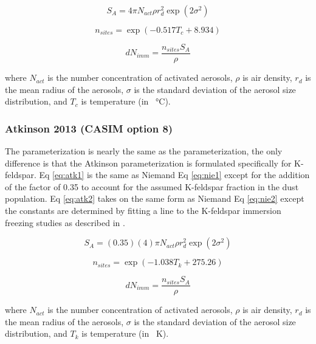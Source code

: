 \begin{equation} \label{eq:nie1}
S_A = 4\pi N_{act}\rho r_d^{2} \exp(2\sigma^{2})
\end{equation}

\begin{equation} \label{eq:nie2}
n_{sites} = \exp(-0.517T_c + 8.934)
\end{equation}

\begin{equation} \label{eq:nie3}
dN_{imm} = \frac{n_{sites} S_A}{\rho}
\end{equation}

where $N_{act}$ is the number concentration of activated aerosols, $\rho$ is air density, $r_d$ is the mean radius of the aerosols, $\sigma$ is the standard deviation of the aerosol size distribution, and $T_c$ is temperature (in \SI{}{\degreeCelsius}).


\subsubsection{Atkinson 2013 (CASIM option 8)}
The \cite{atk2013} parameterization is nearly the same as the \cite{niem2012} parameterization, the only difference is that the Atkinson parameterization is formulated specifically for K-feldspar. Eq \ref{eq:atk1} is the same as Niemand Eq \ref{eq:nie1} except for the addition of the factor of 0.35 to account for the assumed K-feldspar fraction in the dust population. Eq \ref{eq:atk2} takes on the same form as Niemand Eq \ref{eq:nie2} except the constants are determined by fitting a line to the K-feldspar immersion freezing studies as described in \cite{atk2013}.

\begin{equation} \label{eq:atk1}
S_A = (0.35)(4)\pi N_{act} \rho r_d^{2} \exp(2\sigma^{2})
\end{equation}

\begin{equation} \label{eq:atk2}
n_{sites} = \exp(-1.038T_k + 275.26)
\end{equation}

\begin{equation} \label{eq:atk3}
dN_{imm} = \frac{n_{sites}S_A}{\rho}
\end{equation}

where $N_{act}$ is the number concentration of activated aerosols, $\rho$ is air density, $r_d$ is the mean radius of the aerosols, $\sigma$ is the standard deviation of the aerosol size distribution, and $T_k$ is temperature (in \SI{}{K}).


